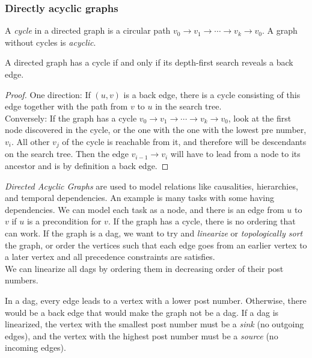 \subsubsection{Directly acyclic graphs}
A \textit{cycle} in a directed graph is a circular path $v_0 \rightarrow v_1 \rightarrow \cdots \rightarrow v_k \rightarrow v_0$.
A graph without cycles is \textit{acyclic}.
\begin{property}
  A directed graph has a cycle if and only if its depth-first search reveals a back edge.
\end{property}

\begin{proof}
  One direction: If $(u, v)$ is a back edge, there is a cycle consisting of this edge together with the path from $v$ to $u$ in the search tree.\\
  Conversely: If the graph has a cycle $v_0 \rightarrow v_1 \rightarrow \cdots \rightarrow v_k \rightarrow v_0$, look at the first node discovered in the cycle, or the one with the one with the lowest pre number, $v_i$.
  All other $v_j$ of the cycle is reachable from it, and therefore will be descendants on the search tree.
  Then the edge $v_{i-1} \rightarrow v_i$ will have to lead from a node to its ancestor and is by definition a back edge.
\end{proof}

\textit{Directed Acyclic Graphs} are used to model relations like causalities, hierarchies, and temporal dependencies.
An example is many tasks with some having dependencies.
We can model each task as a node, and there is an edge from $u$ to $v$ if $u$ is a precondition for $v$.
If the graph has a cycle, there is no ordering that can work.
If the graph is a dag, we want to try and \textit{linearize} or \textit{topologically sort} the graph, or order the vertices such that each edge goes from an earlier vertex to a later vertex and all precedence constraints are satisfies.\\
We can linearize all dags by ordering them in decreasing order of their post numbers.

\begin{property}
  In a dag, every edge leads to a vertex with a lower post number.
  Otherwise, there would be a back edge that would make the graph not be a dag.
  If a dag is linearized, the vertex with the smallest post number must be a \textit{sink} (no outgoing edges), and the vertex with the highest post number must be a \textit{source} (no incoming edges).
\end{property}

